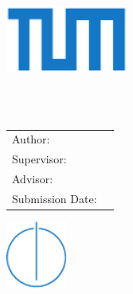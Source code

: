 \begin{titlepage}
  \centering

  \includegraphics[width=40mm]{pages/tum}

  \vspace{5mm}
  {\LARGE\MakeUppercase{\getFacultyTUM{}}}\\

  \vspace{5mm}
  {\large\MakeUppercase{\getUniversityTUM{}}}\\

  \vspace{15mm}
  {\Large \getDoctypeTUM{}}

  \vspace{10mm}
  {\LARGE\bfseries \getTitle{}\par}

  \vspace{5mm}
  {\LARGE\bfseries \getTitleGer{}\par}

  \vspace{15mm}
  \begin{tabular}{l l}
    Author: & \getAuthor{} \\
    Supervisor: & \getSupervisorTUM{} \\
    Advisor: & \getAdvisorTUM{} \\
    Submission Date: & \getSubmissionDate{} \\
  \end{tabular}

  \vspace{10mm}
  \includegraphics[width=20mm]{pages/faculty}
\end{titlepage}
